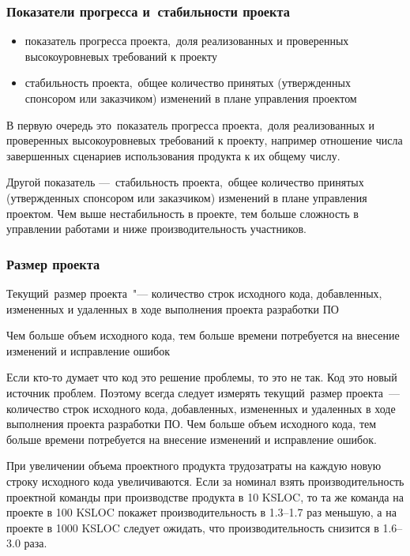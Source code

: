 \documentclass{../industrial-development}
\begin{document}
    \begin{frame} \frametitle{Показатели прогресса и~стабильности проекта}
        \begin{itemize}
            \item \alert{показатель прогресса проекта}, доля реализованных и проверенных высокоуровневых требований к проекту
            \item \alert{стабильность проекта}, общее количество принятых (утвержденных спонсором или заказчиком) изменений в плане управления проектом
        \end{itemize}
    \end{frame}
    \lecturenotes 
В первую очередь это показатель прогресса проекта, доля реализованных и проверенных высокоуровневых требований к проекту, например отношение числа завершенных сценариев использования продукта к их общему числу.

Другой показатель — стабильность проекта, общее количество принятых (утвержденных спонсором или заказчиком) изменений в плане управления проектом. Чем выше нестабильность в проекте, тем больше сложность в управлении работами и ниже производительность участников.

    \begin{frame} \frametitle{Размер проекта}
        \begin{definition}
            \alert{Текущий размер проекта} "--- количество строк исходного кода, добавленных, измененных и удаленных в ходе выполнения проекта разработки ПО
        \end{definition}
        Чем больше объем исходного кода, тем больше времени потребуется на внесение изменений и исправление ошибок
    \end{frame}
    \lecturenotes
Если кто-то думает что код это решение проблемы, то это не так. Код это новый источник проблем. Поэтому всегда следует измерять текущий размер проекта — количество строк исходного кода, добавленных, измененных и удаленных в ходе выполнения проекта разработки ПО. Чем больше объем исходного кода, тем больше времени потребуется на внесение изменений и исправление ошибок.

При увеличении объема проектного продукта трудозатраты на каждую новую строку исходного кода увеличиваются. Если за номинал взять производительность проектной команды при производстве продукта в 10 KSLOC, то та же команда на проекте в 100 KSLOC покажет производительность в 1.3–1.7 раз меньшую, а на проекте в 1000 KSLOC следует ожидать, что производительность снизится в 1.6–3.0 раза.
\end{document}
